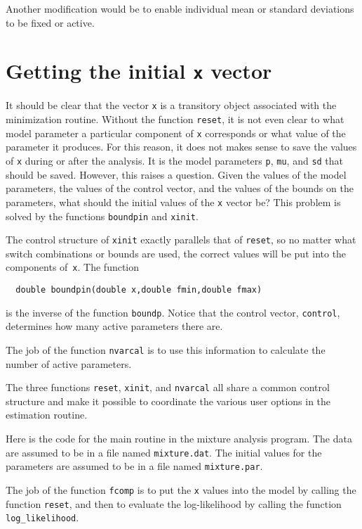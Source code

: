 \documentclass{admbmanual}
\begin{document}
Another modification would be to enable individual mean or standard 
deviations to be fixed or active.


\section{Getting the initial \texttt{x} vector}

It should be clear that the vector \texttt{x} is a transitory object
associated with the minimization routine. Without the function \texttt{reset},
it is not even clear to what model parameter a particular component
of \texttt{x} corresponds or what value of the parameter it produces.
For this reason, it does not makes sense to save the values of
\texttt{x} during or after the analysis. It is the model
parameters \texttt{p}, \texttt{mu}, and \texttt{sd} that should be saved.
However, this raises a question. Given the values of the
model parameters, the values of the control vector, and the
values of the bounds on the parameters, what should the initial values 
of the \texttt{x} vector be? This problem is solved by the functions
\texttt{boundpin} and \texttt{xinit}.


The control structure of \texttt{xinit} exactly parallels that of \texttt{reset},
so no matter what switch combinations or bounds are used, the
correct values will be put into the components of~\texttt{x}.
The function
\begin{lstlisting}
  double boundpin(double x,double fmin,double fmax)
\end{lstlisting}
is the inverse of the function \texttt{boundp}.
Notice that the control vector, \texttt{control}, determines how many 
active parameters there are. 

The job of the function
\texttt{nvarcal} is to use this information to calculate the number
of active parameters.


The three functions \texttt{reset}, \texttt{xinit}, and \texttt{nvarcal}
all share a common control structure and make it possible to
coordinate the various user options in the estimation routine.

Here is the code for the main routine in the mixture analysis 
program. The data are assumed to be in a file named \texttt{mixture.dat}.
The initial values for the parameters are assumed to be in a file
named \texttt{mixture.par}.


The job of the function \texttt{fcomp} is to put the \texttt{x} values into the model
by calling the function \texttt{reset}, and then to evaluate the log-likelihood
by calling the function \texttt{log\_likelihood}.

\end{document}
